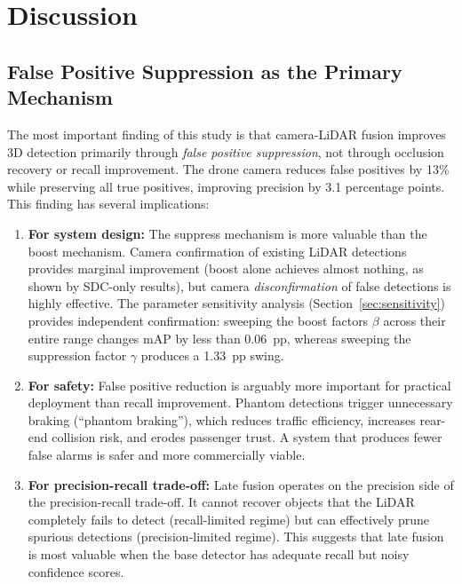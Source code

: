 \documentclass[sustainability,article,submit,moreauthors,pdftex]{Definitions/mdpi}
\begin{document}
\section{Discussion}\label{sec:discussion}

\subsection{False Positive Suppression as the Primary Mechanism}

The most important finding of this study is that camera-LiDAR fusion improves 3D detection primarily through \emph{false positive suppression}, not through occlusion recovery or recall improvement. The drone camera reduces false positives by 13\% while preserving all true positives, improving precision by 3.1 percentage points. This finding has several implications:

\begin{enumerate}[leftmargin=*,labelsep=4.9mm]
\item \textbf{For system design:} The suppress mechanism is more valuable than the boost mechanism. Camera confirmation of existing LiDAR detections provides marginal improvement (boost alone achieves almost nothing, as shown by SDC-only results), but camera \emph{disconfirmation} of false detections is highly effective. The parameter sensitivity analysis (Section~\ref{sec:sensitivity}) provides independent confirmation: sweeping the boost factors $\beta$ across their entire range changes mAP by less than 0.06~pp, whereas sweeping the suppression factor $\gamma$ produces a 1.33~pp swing.

\item \textbf{For safety:} False positive reduction is arguably more important for practical deployment than recall improvement. Phantom detections trigger unnecessary braking (``phantom braking''), which reduces traffic efficiency, increases rear-end collision risk, and erodes passenger trust. A system that produces fewer false alarms is safer and more commercially viable.

\item \textbf{For precision-recall trade-off:} Late fusion operates on the precision side of the precision-recall trade-off. It cannot recover objects that the LiDAR completely fails to detect (recall-limited regime) but can effectively prune spurious detections (precision-limited regime). This suggests that late fusion is most valuable when the base detector has adequate recall but noisy confidence scores.
\end{enumerate}
\end{document}

